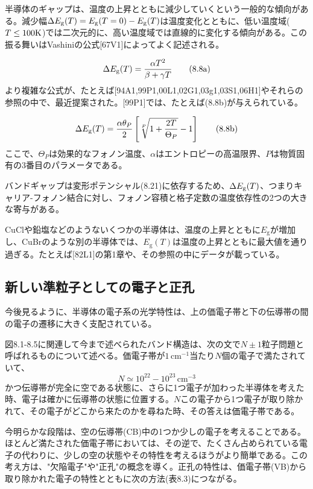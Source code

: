 \documentclass[11pt,a4j,uplatex]{jsarticle}
\begin{document}
半導体のギャップは、温度の上昇とともに減少していくという一般的な傾向がある。減少幅$\Delta E_{\rm{g}}(T)=E_{\rm{g}}(T=0)-E_{\rm{g}}(T)$は温度変化とともに、低い温度域($T\leq100\rm{K}$)では二次元的に、高い温度域では直線的に変化する傾向がある。この振る舞いはVashiniの公式[67V1]によってよく記述される。

\begin{equation}
  \Delta E_{\rm{g}}(T)=\frac{\alpha T^2}{\beta+\gamma T}
  \tag{8.8a}
\end{equation}
より複雑な公式が、たとえば[94A1,99P1,00L1,02G1,03g1,03S1,06H1]やそれらの参照の中で、最近提案された。[99P1]では、たとえば(8.8b)が与えられている。

\begin{equation}
  \Delta E_{\rm{g}}(T)=\frac{\alpha\theta_P}{2}\left[\sqrt[P]{1+\frac{2T}{\Theta_P}}-1\right]
  \tag{8.8b}
\end{equation}
ここで、$\Theta_P$は効果的なフォノン温度、$\alpha$はエントロピーの高温限界、$P$は物質固有の3番目のパラメータである。

バンドギャップは変形ポテンシャル(8.21)に依存するため、$\Delta E_{\rm{g}}(T)$、つまりキャリア-フォノン結合に対し、フォノン容積と格子定数の温度依存性の2つの大きな寄与がある。

CuClや鉛塩などのようないくつかの半導体は、温度の上昇とともに$E_\mathrm{g}$が増加し、CuBrのような別の半導体では、$E_\mathrm{g}(T)$は温度の上昇とともに最大値を通り過ぎる。たとえば[82L1]の第1章や、その参照の中にデータが載っている。

\subsection{新しい準粒子としての電子と正孔}

今後見るように、半導体の電子系の光学特性は、上の価電子帯と下の伝導帯の間の電子の遷移に大きく支配されている。

図8.1-8.5に関連して今まで述べられたバンド構造は、次の文で$N\pm1$粒子問題と呼ばれるものについて述べる。価電子帯が$1\,\mathrm{cm}^{-1}$当たり$N$個の電子で満たされていて、
\begin{equation}
  N\simeq10^{22}-10^{23}\,\mathrm{cm}^{-3}
  \tag{8.9}
\end{equation}
かつ伝導帯が完全に空である状態に、さらに1つ電子が加わった半導体を考えた時、電子は確かに伝導帯の状態に位置する。$N$この電子から1つ電子が取り除かれて、その電子がどこから来たのかを尋ねた時、その答えは価電子帯である。

今明らかな段階は、空の伝導帯(CB)中の1つか少しの電子を考えることである。ほとんど満たされた価電子帯においては、その逆で、たくさん占められている電子の代わりに、少しの空の状態やその特性を考えるほうがより簡単である。この考え方は、"欠陥電子"や"正孔"の概念を導く。正孔の特性は、価電子帯(VB)から取り除かれた電子の特性とともに次の方法(表8.3)につながる。
\end{document}
